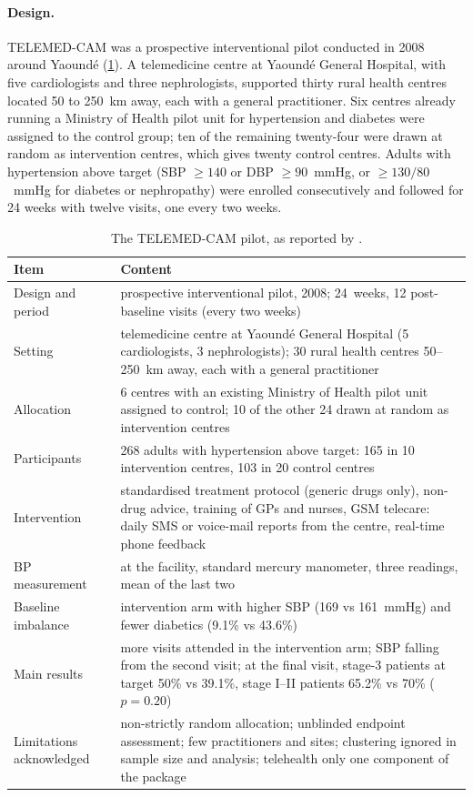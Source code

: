 \documentclass[12pt,a4paper,oneside]{report}
\begin{document}
\paragraph{Design.} TELEMED-CAM was a prospective interventional pilot conducted in 2008 around Yaoundé (\cref{tab:telemedcam}). A telemedicine centre at Yaoundé General Hospital, with five cardiologists and three nephrologists, supported thirty rural health centres located 50 to 250~km away, each with a general practitioner. Six centres already running a Ministry of Health pilot unit for hypertension and diabetes were assigned to the control group; ten of the remaining twenty-four were drawn at random as intervention centres, which gives twenty control centres. Adults with hypertension above target (SBP $\geq 140$ or DBP $\geq 90$~mmHg, or $\geq 130/80$~mmHg for diabetes or nephropathy) were enrolled consecutively and followed for 24 weeks with twelve visits, one every two weeks.

\begin{table}[htbp]
\centering\footnotesize
\caption{The TELEMED-CAM pilot, as reported by \textcite{kingue2013}.}\label{tab:telemedcam}
\begin{tabularx}{\textwidth}{@{}>{\raggedright\arraybackslash}p{3.3cm} X@{}}
\toprule
\textbf{Item} & \textbf{Content} \\
\midrule
Design and period & prospective interventional pilot, 2008; 24~weeks, 12 post-baseline visits (every two weeks) \\
Setting & telemedicine centre at Yaoundé General Hospital (5 cardiologists, 3 nephrologists); 30 rural health centres 50--250~km away, each with a general practitioner \\
Allocation & 6 centres with an existing Ministry of Health pilot unit assigned to control; 10 of the other 24 drawn at random as intervention centres \\
Participants & 268 adults with hypertension above target: 165 in 10 intervention centres, 103 in 20 control centres \\
Intervention & standardised treatment protocol (generic drugs only), non-drug advice, training of GPs and nurses, GSM telecare: daily SMS or voice-mail reports from the centre, real-time phone feedback \\
BP measurement & at the facility, standard mercury manometer, three readings, mean of the last two \\
Baseline imbalance & intervention arm with higher SBP (169 vs 161~mmHg) and fewer diabetics (9.1\% vs 43.6\%) \\
Main results & more visits attended in the intervention arm; SBP falling from the second visit; at the final visit, stage-3 patients at target 50\% vs 39.1\%, stage I--II patients 65.2\% vs 70\% ($p=0.20$) \\
Limitations acknowledged & non-strictly random allocation; unblinded endpoint assessment; few practitioners and sites; clustering ignored in sample size and analysis; telehealth only one component of the package \\
\bottomrule
\end{tabularx}
\end{table}
\end{document}
